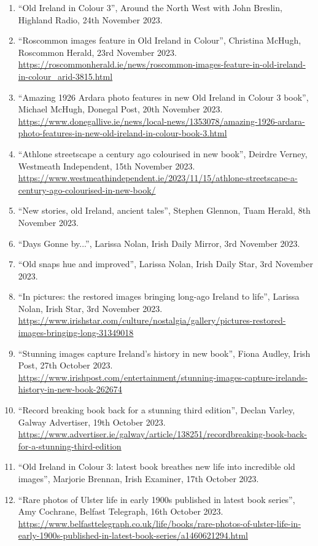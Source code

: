 \documentclass[10pt,a4paper]{res} %
\begin{document}
\begin{resume}
{\begin{enumerate}
\item ``Old Ireland in Colour 3'', Around the North West with John Breslin, Highland Radio, 24th November 2023.
\item ``Roscommon images feature in Old Ireland in Colour'', Christina McHugh, Roscommon Herald, 23rd November 2023. \url{https://roscommonherald.ie/news/roscommon-images-feature-in-old-ireland-in-colour_arid-3815.html}
\item ``Amazing 1926 Ardara photo features in new Old Ireland in Colour 3 book'', Michael McHugh, Donegal Post, 20th November 2023. \url{https://www.donegallive.ie/news/local-news/1353078/amazing-1926-ardara-photo-features-in-new-old-ireland-in-colour-book-3.html}
\item ``Athlone streetscape a century ago colourised in new book'', Deirdre Verney, Westmeath Independent, 15th November 2023. \url{https://www.westmeathindependent.ie/2023/11/15/athlone-streetscape-a-century-ago-colourised-in-new-book/}
\item ``New stories, old Ireland, ancient tales'', Stephen Glennon, Tuam Herald, 8th November 2023.
\item ``Days Gonne by...'', Larissa Nolan, Irish Daily Mirror, 3rd November 2023.
\item ``Old snaps hue and improved'', Larissa Nolan, Irish Daily Star, 3rd November 2023.
\item ``In pictures: the restored images bringing long-ago Ireland to life'', Larissa Nolan, Irish Star, 3rd November 2023. \url{https://www.irishstar.com/culture/nostalgia/gallery/pictures-restored-images-bringing-long-31349018}
\item ``Stunning images capture Ireland's history in new book'', Fiona Audley, Irish Post, 27th October 2023. \url{https://www.irishpost.com/entertainment/stunning-images-capture-irelands-history-in-new-book-262674}
\item ``Record breaking book back for a stunning third edition'', Declan Varley, Galway Advertiser, 19th October 2023. \url{https://www.advertiser.ie/galway/article/138251/recordbreaking-book-back-for-a-stunning-third-edition}
\item ``Old Ireland in Colour 3: latest book breathes new life into incredible old images'', Marjorie Brennan, Irish Examiner, 17th October 2023.
\item ``Rare photos of Ulster life in early 1900s published in latest book series'', Amy Cochrane, Belfast Telegraph, 16th October 2023. \url{https://www.belfasttelegraph.co.uk/life/books/rare-photos-of-ulster-life-in-early-1900s-published-in-latest-book-series/a1460621294.html}

\end{enumerate}}
\end{resume}
\end{document}
